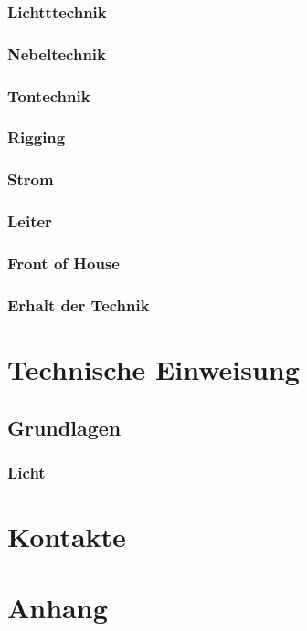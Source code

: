 \documentclass[a4paper]{article}
\begin{document}
\subsubsection{Lichtttechnik}
\subsubsection{Nebeltechnik}
\subsubsection{Tontechnik}
\subsubsection{Rigging}
\subsubsection{Strom}
\subsubsection{Leiter}
\subsubsection{Front of House}
\subsubsection{Erhalt der Technik}

\newpage

\section{Technische Einweisung}
\subsection{Grundlagen}
\subsubsection{Licht}

\newpage

\section{Kontakte}
\section{Anhang}
\end{document}
